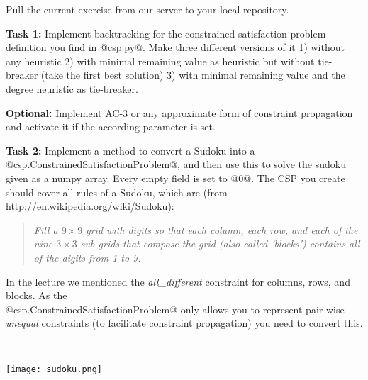 

\renewcommand{\course}{Artificial Intelligence}
\renewcommand{\coursepicture}{course_ai}
\renewcommand{\coursedate}{Winter 2019}
\renewcommand{\exnum}{5}

\exercises



Pull the current exercise from our server to your local repository.

\textbf{Task 1:} Implement backtracking for the constrained satisfaction problem
definition you find in @csp.py@. Make three different versions of it 1) without
any heuristic 2) with minimal remaining value as heuristic but without
tie-breaker (take the first best solution) 3) with minimal remaining value and
the degree heuristic as tie-breaker.

\textbf{Optional:} Implement AC-3 or any approximate form of
constraint propagation and activate it if the according
parameter is set.

\textbf{Task 2:} Implement a method to convert a Sudoku into a
@csp.ConstrainedSatisfactionProblem@, and then use this to solve the sudoku given as a numpy array. Every empty field is set to
@0@. The CSP you create should cover all rules of a Sudoku, which are
(from
\url{http://en.wikipedia.org/wiki/Sudoku}): 
\begin{quote}
\emph{Fill a $9 \times 9$ grid with digits so that each column, each row,
and each of the nine $3 \times 3$ sub-grids that compose the grid
(also called 'blocks') contains all of the digits from 1 to 9.}
\end{quote}
In the lecture we mentioned the \emph{all\_different} constraint for
columns, rows, and blocks. As the\\ @csp.ConstrainedSatisfactionProblem@
only allows you to represent pair-wise \emph{unequal} constraints (to
facilitate constraint propagation) you need to convert this.

~

\begin{center}
\texttt{[image: sudoku.png]}
\end{center}


